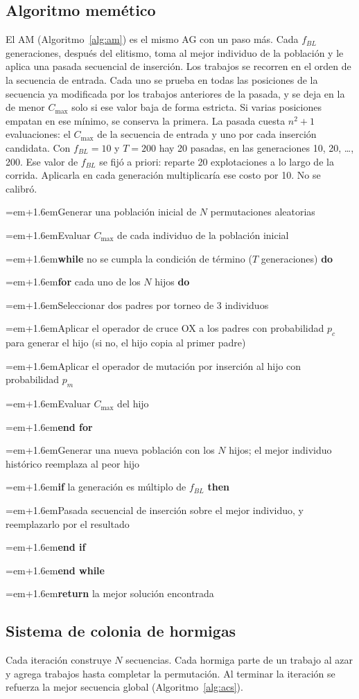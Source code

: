 \documentclass[journal]{IEEEtran}
\newcommand{\al}[2]{\par\noindent\hangindent=\dimexpr#1em+1.6em\relax\hangafter=1\hspace*{#1em}\li#2}
\newcounter{lin}\newcommand{\li}{\stepcounter{lin}\thelin:\ }
\begin{document}
\subsection{Algoritmo memético}
El AM (Algoritmo~\ref{alg:am}) es el mismo AG con un paso más. Cada $f_{BL}$ generaciones, después del elitismo, toma al mejor individuo de la población y le aplica una pasada secuencial de inserción. Los trabajos se recorren en el orden de la secuencia de entrada. Cada uno se prueba en todas las posiciones de la secuencia ya modificada por los trabajos anteriores de la pasada, y se deja en la de menor $C_{\max}$ solo si ese valor baja de forma estricta. Si varias posiciones empatan en ese mínimo, se conserva la primera. La pasada cuesta $n^2+1$ evaluaciones: el $C_{\max}$ de la secuencia de entrada y uno por cada inserción candidata. Con $f_{BL}=10$ y $T=200$ hay 20 pasadas, en las generaciones 10, 20, \ldots, 200. Ese valor de $f_{BL}$ se fijó a priori: reparte 20 explotaciones a lo largo de la corrida. Aplicarla en cada generación multiplicaría ese costo por 10. No se calibró.

\begin{algoritmo}[H]
  \caption{Algoritmo memético (AM).}\label{alg:am}
  \footnotesize\setcounter{lin}{0}
  \al{0}{Generar una población inicial de $N$ permutaciones aleatorias}
  \al{0}{Evaluar $C_{\max}$ de cada individuo de la población inicial}
  \al{0}{\textbf{while} no se cumpla la condición de término ($T$ generaciones) \textbf{do}}
  \al{1}{\textbf{for} cada uno de los $N$ hijos \textbf{do}}
  \al{2}{Seleccionar dos padres por torneo de 3 individuos}
  \al{2}{Aplicar el operador de cruce OX a los padres con probabilidad $p_c$ para generar el hijo (si no, el hijo copia al primer padre)}
  \al{2}{Aplicar el operador de mutación por inserción al hijo con probabilidad $p_m$}
  \al{2}{Evaluar $C_{\max}$ del hijo}
  \al{1}{\textbf{end for}}
  \al{1}{Generar una nueva población con los $N$ hijos; el mejor individuo histórico reemplaza al peor hijo}
  \al{1}{\textbf{if} la generación es múltiplo de $f_{BL}$ \textbf{then}}
  \al{2}{Pasada secuencial de inserción sobre el mejor individuo, y reemplazarlo por el resultado}
  \al{1}{\textbf{end if}}
  \al{0}{\textbf{end while}}
  \al{0}{\textbf{return} la mejor solución encontrada}
\end{algoritmo}

\subsection{Sistema de colonia de hormigas}
Cada iteración construye $N$ secuencias. Cada hormiga parte de un trabajo al azar y agrega trabajos hasta completar la permutación. Al terminar la iteración se refuerza la mejor secuencia global (Algoritmo~\ref{alg:acs}).
\end{document}
